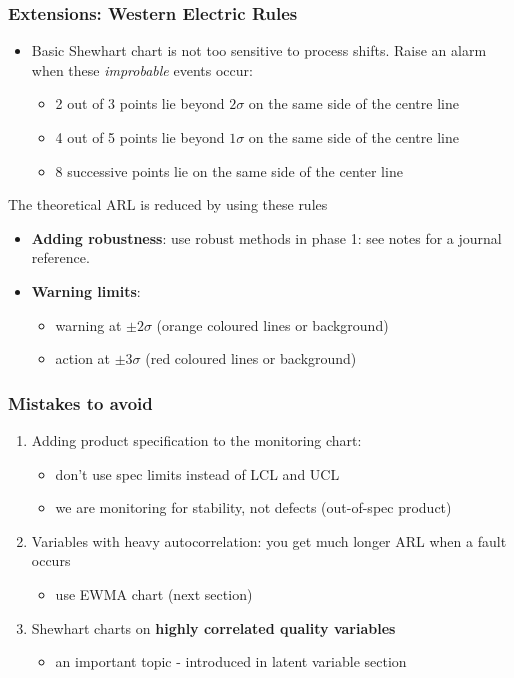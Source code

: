 \begin{frame}\frametitle{Extensions: Western Electric Rules}
	\begin{itemize}
		\item	Basic Shewhart chart is not too sensitive to process shifts. Raise an alarm when these \emph{improbable} events occur: 
		\begin{itemize}
			\item	2 out of 3 points lie beyond $2\sigma$ on the same side of the centre line 
			\item	4 out of 5 points lie beyond $1\sigma$ on the same side of the centre line 
			\item	8 successive points lie on the same side of the center line 
		\end{itemize}
	\end{itemize}
	
	The theoretical ARL is reduced by using these rules
	\begin{itemize}
		\item	\textbf{Adding robustness}: use robust methods in phase 1: see notes for a journal reference. 
	\end{itemize}
	\begin{itemize}
		\item	\textbf{Warning limits}: 
		\begin{itemize}
			\item	warning at $\pm 2 \sigma$ (orange coloured lines or background) 
			\item	action at $\pm 3\sigma$ (red coloured lines or background) 
		\end{itemize}
	\end{itemize}
\end{frame}

\begin{frame}\frametitle{Mistakes to avoid}
	\begin{enumerate}
		\item	Adding product specification to the monitoring chart: 
		\begin{itemize}
			\item	don't use spec limits instead of LCL and UCL 
			\item	we are monitoring for stability, not defects (out-of-spec product) 
		\end{itemize}
		\item	Variables with heavy autocorrelation: you get much longer ARL when a fault occurs 
		\begin{itemize}
			\item	use EWMA chart (next section) 
		\end{itemize}
		\item	Shewhart charts on \textbf{highly correlated quality variables} 
		\begin{itemize}
			\item	an important topic - introduced in latent variable section 
		\end{itemize}
	\end{enumerate}
\end{frame}

